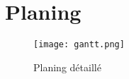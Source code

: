 \documentclass[12pt]{article}
\begin{document}
    \section{Planing}

    \begin{figure}[H]
        \centering
        \texttt{[image: gantt.png]}
        \caption{Planing détaillé}
    \end{figure}
\end{document}
